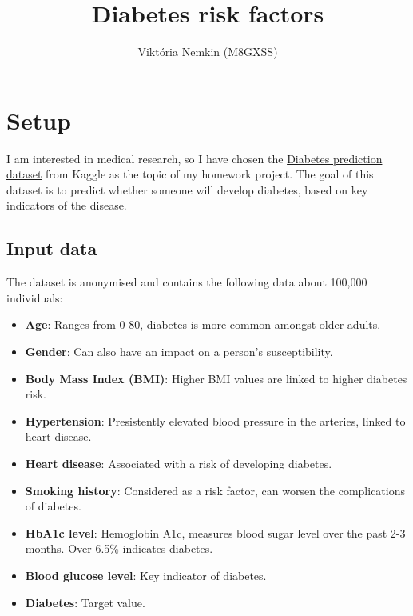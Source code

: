 \documentclass[11pt]{article}
\title{Diabetes risk factors}
\author{Viktória Nemkin (M8GXSS)}
\providecommand{\tightlist}{%
      \setlength{\itemsep}{0pt}\setlength{\parskip}{0pt}}
\begin{document}
    
    \maketitle
    
    

    
    \hypertarget{setup}{%
\section{Setup}\label{setup}}

I am interested in medical research, so I have chosen the
\href{https://www.kaggle.com/datasets/iammustafatz/diabetes-prediction-dataset}{Diabetes
prediction dataset} from Kaggle as the topic of my homework project. The
goal of this dataset is to predict whether someone will develop
diabetes, based on key indicators of the disease.

    \hypertarget{input-data}{%
\subsection{Input data}\label{input-data}}

The dataset is anonymised and contains the following data about 100,000
individuals:

\begin{itemize}
\tightlist
\item
  \textbf{Age}: Ranges from 0-80, diabetes is more common amongst older
  adults.
\item
  \textbf{Gender}: Can also have an impact on a person's susceptibility.
\item
  \textbf{Body Mass Index (BMI)}: Higher BMI values are linked to higher
  diabetes risk.
\item
  \textbf{Hypertension}: Presistently elevated blood pressure in the
  arteries, linked to heart disease.
\item
  \textbf{Heart disease}: Associated with a risk of developing diabetes.
\item
  \textbf{Smoking history}: Considered as a risk factor, can worsen the
  complications of diabetes.
\item
  \textbf{HbA1c level}: Hemoglobin A1c, measures blood sugar level over
  the past 2-3 months. Over 6.5\% indicates diabetes.
\item
  \textbf{Blood glucose level}: Key indicator of diabetes.
\item
  \textbf{Diabetes}: Target value.
\end{itemize}
\end{document}
